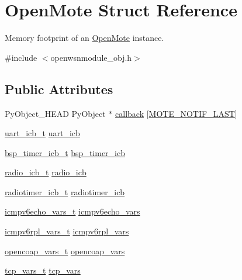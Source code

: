 \hypertarget{struct_open_mote}{}\section{Open\+Mote Struct Reference}
\label{struct_open_mote}


Memory footprint of an \hyperlink{struct_open_mote}{Open\+Mote} instance.  




{\ttfamily \#include $<$openwsnmodule\+\_\+obj.\+h$>$}

\subsection*{Public Attributes}
\begin{DoxyCompactItemize}
\item 
Py\+Object\+\_\+\+H\+E\+AD Py\+Object $\ast$ \hyperlink{struct_open_mote_a960808a339e5da997df2ccf44cf33c40}{callback} \mbox{[}\hyperlink{openwsnmodule__obj_8h_a9b29769343da78881f442e657eb62b6ea3ff4b4260fafab1e360f2b7b3b18105a}{M\+O\+T\+E\+\_\+\+N\+O\+T\+I\+F\+\_\+\+L\+A\+ST}\mbox{]}
\item 
\hyperlink{structuart__icb__t}{uart\+\_\+icb\+\_\+t} \hyperlink{struct_open_mote_a4099b81ba7292a13c29f49b062a98ce6}{uart\+\_\+icb}
\item 
\hyperlink{structbsp__timer__icb__t}{bsp\+\_\+timer\+\_\+icb\+\_\+t} \hyperlink{struct_open_mote_aec0c6f65a74467f57a4068531efd2bfb}{bsp\+\_\+timer\+\_\+icb}
\item 
\hyperlink{structradio__icb__t}{radio\+\_\+icb\+\_\+t} \hyperlink{struct_open_mote_ac0f941ac98e21115b10e0c1af009eb81}{radio\+\_\+icb}
\item 
\hyperlink{structradiotimer__icb__t}{radiotimer\+\_\+icb\+\_\+t} \hyperlink{struct_open_mote_a5ceff4b6431ea734d207710a724693f6}{radiotimer\+\_\+icb}
\item 
\hyperlink{structicmpv6echo__vars__t}{icmpv6echo\+\_\+vars\+\_\+t} \hyperlink{struct_open_mote_a74d216986865202f5926575d3242d295}{icmpv6echo\+\_\+vars}
\item 
\hyperlink{structicmpv6rpl__vars__t}{icmpv6rpl\+\_\+vars\+\_\+t} \hyperlink{struct_open_mote_a01fe7b57f57b11c5fa7023c87949d81d}{icmpv6rpl\+\_\+vars}
\item 
\hyperlink{structopencoap__vars__t}{opencoap\+\_\+vars\+\_\+t} \hyperlink{struct_open_mote_ab5bab0ddb3925a9e553328506c80c6ce}{opencoap\+\_\+vars}
\item 
\hyperlink{structtcp__vars__t}{tcp\+\_\+vars\+\_\+t} \hyperlink{struct_open_mote_ae9aa5a246bdfe0db2d795dbf6acb9665}{tcp\+\_\+vars}

\end{DoxyCompactItemize}
